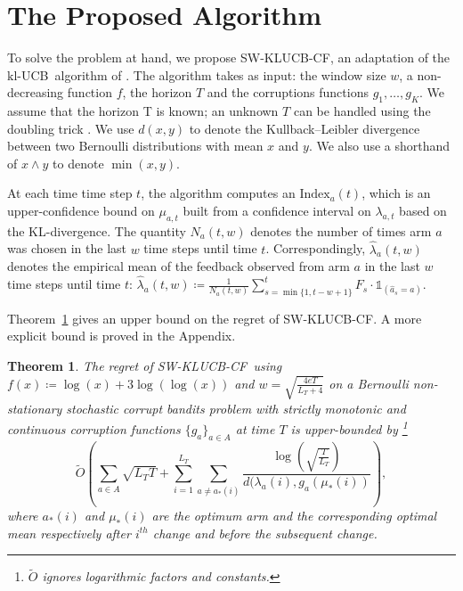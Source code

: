 \documentclass[letterpaper]{article} %
\newcommand{\ind}{\mathds{1}}
\newcommand{\ArmAt}{\hat{a}}
\newcommand{\defined}{\coloneqq}
\newcommand{\SWKLUCBCF}{\textsc{SW-KLUCB-CF}}
\newcommand{\KLUCB}{$\mathrm{kl}$-\textsc{UCB}}
\newcommand{\cB}{\mathcal{B}}
\newcommand{\optMeanAtIChanges}[1]{\mu_{*}(#1)}
\newcommand{\MeanFeAtIChanges}[2]{\lambda_#1(#2)}
\newcommand{\optArmAtIChanges}[1]{a_{*}(#1)}
\newcommand{\meanReward}[2]{\mu_{#1, #2}}
\newcommand{\meanFeedback}[2]{\lambda_{#1, #2}}
\newcommand{\numChanges}{L}
\newcommand{\windowsize}{w}
\newtheorem{myTheorem}{Theorem}
\begin{document}
\section{The Proposed Algorithm}
To solve the problem at hand, we propose \SWKLUCBCF,
an adaptation of the \KLUCB \ algorithm of \citet{KLUCBJournal}. 
The algorithm takes as input: the window size $\windowsize$, a non-decreasing function $f$, the horizon $T$ and the corruptions functions $g_1, \dots, g_K$. We assume that the horizon T is known; an unknown $T$ can be handled using the doubling trick \citep{besson:hal-01736357}. We use $d(x,y)$ to denote the Kullback–Leibler divergence between two Bernoulli distributions with mean $x$ and $y$. 
We also use a shorthand of $x \wedge y$ to denote $\min(x,y)$.


At each time time step $t$, the algorithm computes an $\mathrm{Index}_a(t)$, which is an upper-confidence bound on $\meanReward{a}{t}$ built from a confidence interval on $\meanFeedback{a}{t}$ based on the KL-divergence. 
The quantity $N_a(t, \windowsize)$ denotes the number of times arm $a$ was chosen in the last $\windowsize$ time steps until time $t$.
Correspondingly, $\hat{\lambda}_a(t, \windowsize)$ denotes the empirical mean of the feedback observed from arm $a$ in the last $\windowsize$ time steps until time $t$: $\hat{\lambda}_a(t, w) \defined \frac{1}{N_a(t, \windowsize)}\sum_{s=\min\{1, t-\windowsize+1\}}^t F_s \cdot \ind_{(\ArmAt_s = a)}$. 



Theorem~\ref{MainTheorem1}  gives an upper bound on the regret of \SWKLUCBCF. A more explicit bound is proved in the Appendix.

\begin{myTheorem}
\label{MainTheorem1} 
The regret of \SWKLUCBCF \ using  $f(x) \defined \log(x)+3\log(\log(x))$ and $\windowsize = \sqrt{ \frac{4eT}{\numChanges_T + 4}}$ on a  
Bernoulli non-stationary stochastic corrupt bandits problem with strictly monotonic and continuous corruption functions $\{g_a\}_{a \in A}$ at time $T$ is upper-bounded by \footnote{$\tilde{O}$ ignores logarithmic factors and constants.}
$$
\tilde{O}\left( \sum_{a \in A} \sqrt{\numChanges_T T} + \sum_{i=1}^{\numChanges_T} \sum_{a \neq \optArmAtIChanges{i}} \frac{\log{\left(  \sqrt{ \frac{T}{\numChanges_T}} \right)}}{d(\MeanFeAtIChanges{a}{i},g_a(\optMeanAtIChanges{i})} \right),
$$
where $\optArmAtIChanges{i}$ and $\optMeanAtIChanges{i}$ are the optimum arm and the corresponding optimal mean respectively after $i^{th}$ change and before the subsequent change.
\end{myTheorem}
\end{document}
